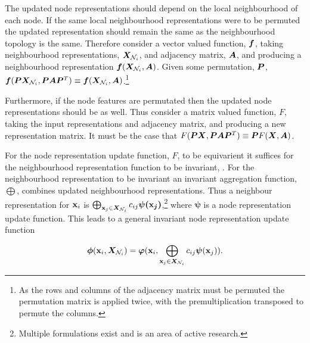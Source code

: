 

The updated node representations should depend on the local neighbourhood of each node.
If the same local neighbourhood representations were to be permuted the updated representation should remain the same as the neighbourhood topology is the same.
Therefore consider a vector valued function, ${\bm{f}}$, taking neighbourhood representations, ${\bm{X}}_{{\mathcal{N}}_i}$, and adjacency matrix, ${\bm{A}}$, and producing a neighbourhood representation ${\bm{f}}({\bm{X}}_{{\mathcal{N}}_i}, {\bm{A}})$.
Given some permutation, ${\bm{P}}$, ${\bm{f}}({\bm{P}}{\bm{X}}_{{\mathcal{N}}_i}, {\bm{P}}{\bm{A}}{\bm{P}}^T) \equiv {\bm{f}}({\bm{X}}_{{\mathcal{N}}_i}, {\bm{A}})$.\footnote{As the rows and columns of the adjacency matrix must be permuted the permutation matrix is applied twice, with the premultiplication transposed to permute the columns.}

Furthermore, if the node features are permutated then the updated node representations should be as well.
Thus consider a matrix valued function, $F$, taking the input representations and adjacency matrix, and producing a new representation matrix.
It must be the case that $F({\bm{P}}{\bm{X}}, {\bm{P}}{\bm{A}}{\bm{P}}^T) \equiv {\bm{P}} F({\bm{X}}, {\bm{A}})$.

For the node representation update function, $F$, to be equivarient it suffices for the neighbourhood representation function to be invariant, .
For the neighbourhood representation to be invariant an invariant aggregation function, $\bigoplus$, combines updated neighbourhood representations.
Thus a neighbour representation for ${\textbf{x}}_i$ is $\bigoplus_{{\textbf{x}}_j \in {\bm{X}}_{{\mathcal{N}}_i}}c_{ij}\bm{\psi({\textbf{x}}_j)}$,\footnote{Multiple formulations exist and is an area of active research.}
where $\bm{\psi}$ is a node representation update function.
This leads to a general invariant node representation update function

\begin{equation}
    \label{eq:conv-def}
    \bm{\phi}({\textbf{x}}_i, {\bm{X}}_{{\mathcal{N}}_i}) = \bm{\varphi}({\textbf{x}}_i, \bigoplus_{{\textbf{x}}_j \in {\bm{X}}_{{\mathcal{N}}_i}}c_{ij}\bm{\psi}({\textbf{x}}_j)).
\end{equation}


